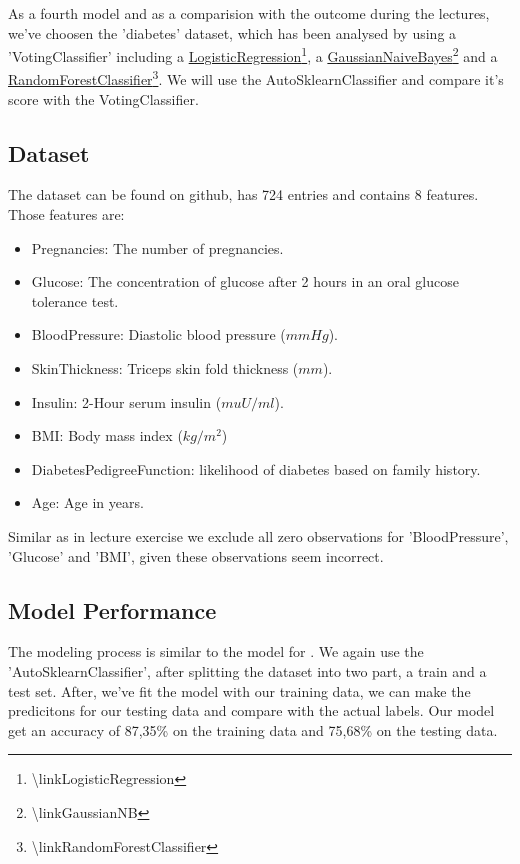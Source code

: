 As a fourth model and as a comparision with the outcome during the lectures, we've choosen the 'diabetes' dataset, which has been analysed by using a 'VotingClassifier' including a \href{\linkLogisticRegression}{LogisticRegression\footnote{\url{\linkLogisticRegression}}}, a \href{\linkGaussianNB}{GaussianNaiveBayes\footnote{\url{\linkGaussianNB}}} and a \href{\linkRandomForestClassifier}{RandomForestClassifier\footnote{\url{\linkRandomForestClassifier}}}. We will use the AutoSklearnClassifier and compare it's score with the VotingClassifier.

\subsection{Dataset}

The dataset can be found on github, has 724 entries and contains 8 features. Those features are:

\begin{itemize}
  \item Pregnancies: The number of pregnancies.
  \item Glucose: The concentration of glucose after 2 hours in an oral glucose tolerance test.
  \item BloodPressure: Diastolic blood pressure ($mm Hg$).
  \item SkinThickness: Triceps skin fold thickness ($mm$).
  \item Insulin: 2-Hour serum insulin ($mu U/ml$).
  \item BMI: Body mass index ($kg/m^2$)
  \item DiabetesPedigreeFunction: likelihood of diabetes based on family history.
  \item Age: Age in years.
\end{itemize}

Similar as in lecture exercise we exclude all zero observations for 'BloodPressure', 'Glucose' and 'BMI', given these observations seem incorrect.

\subsection{Model Performance}

The modeling process is similar to the model for . We again use the 'AutoSklearnClassifier', after splitting the dataset into two part, a train and a test set.
After, we've fit the model with our training data, we can make the predicitons for our testing data and compare with the actual labels.
Our model get an accuracy of 87,35\% on the training data and 75,68\% on the testing data.

